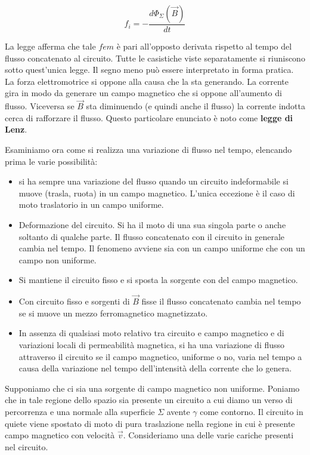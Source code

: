 \[
	f_i = - \frac{d\Phi_{\Sigma}(\vec{B} )}{dt}
\]

La legge afferma che tale $fem$ è pari all'opposto derivata rispetto al tempo del flusso concatenato al circuito.
Tutte le casistiche viste separatamente si riuniscono sotto quest'unica legge. Il segno meno può essere interpretato in forma pratica. La forza elettromotrice si oppone alla causa che la sta generando. La corrente gira in modo da generare un campo magnetico che si oppone all'aumento di flusso. Viceversa se $\vec{B}$ sta diminuendo (e quindi anche il flusso) la corrente indotta cerca di rafforzare il flusso. Questo particolare enunciato è noto come \textbf{legge di Lenz}.

Esaminiamo ora come si realizza una variazione di flusso nel tempo, elencando prima le varie possibilità:

\begin{itemize}
	\item si ha sempre una variazione del flusso quando un circuito indeformabile si muove (trasla, ruota) in un campo magnetico. L'unica eccezione è il caso di moto traslatorio in un campo uniforme.
	\item Deformazione del circuito. Si ha il moto di una sua singola parte o anche soltanto di qualche parte. Il flusso concatenato con il circuito in generale cambia nel tempo. Il fenomeno avviene sia con un campo uniforme che con un campo non uniforme.
	\item Si mantiene il circuito fisso e si sposta la sorgente con del campo magnetico.
	\item Con circuito fisso e sorgenti di $\vec{B}$ fisse il flusso concatenato cambia nel tempo se si muove un mezzo ferromagnetico magnetizzato.
	\item In assenza di qualsiasi moto relativo tra circuito e campo magnetico e di variazioni locali di permeabilità magnetica, si ha una variazione di flusso attraverso il circuito se il campo magnetico, uniforme o no, varia nel tempo a causa della variazione nel tempo dell'intensità della corrente che lo genera.
\end{itemize}

Supponiamo che ci sia una sorgente di campo magnetico non uniforme. Poniamo che in tale regione dello spazio sia presente un circuito a cui diamo un verso di percorrenza e una normale alla superficie $\Sigma$ avente $\gamma$ come contorno. Il circuito in quiete viene spostato di moto di pura traslazione nella regione in cui è presente campo magnetico con velocità $\vec{v}$. Consideriamo una delle varie cariche presenti nel circuito.

